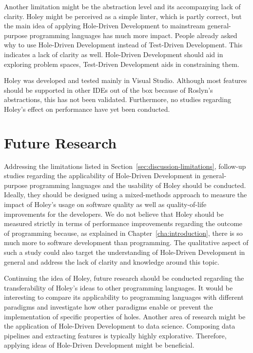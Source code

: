 Another limitation might be the abstraction level and its accompanying lack of clarity.
Holey might be perceived as a simple linter, which is partly correct, but the main idea of applying Hole-Driven Development to mainstream general-purpose programming languages has much more impact.
People already asked why to use Hole-Driven Development instead of Test-Driven Development.
This indicates a lack of clarity as well.
Hole-Driven Development should aid in exploring problem spaces, Test-Driven Development aids in constraining them.

Holey was developed and tested mainly in Visual Studio.
Although most features should be supported in other IDEs out of the box because of Roslyn's abstractions, this has not been validated.
Furthermore, no studies regarding Holey's effect on performance have yet been conducted.


\section{Future Research}
\label{sec:discussion-future-research}
Addressing the limitations listed in Section~\ref{sec:discussion-limitations}, follow-up studies regarding the applicability of Hole-Driven Development in general-purpose programming languages and the usability of Holey should be conducted.
Ideally, they should be designed using a mixed-methods approach to measure the impact of Holey's usage on software quality as well as quality-of-life improvements for the developers.
We do not believe that Holey should be measured strictly in terms of performance improvements regarding the outcome of programming because, as explained in Chapter~\ref{cha:introduction}, there is so much more to software development than programming.
The qualitative aspect of such a study could also target the understanding of Hole-Driven Development in general and address the lack of clarity and knowledge around this topic.

Continuing the idea of Holey, future research should be conducted regarding the transferability of Holey's ideas to other programming languages.
It would be interesting to compare its applicability to programming languages with different paradigms and investigate how other paradigms enable or prevent the implementation of specific properties of holes.
Another area of research might be the application of Hole-Driven Development to data science.
Composing data pipelines and extracting features is typically highly explorative.
Therefore, applying ideas of Hole-Driven Development might be beneficial.

